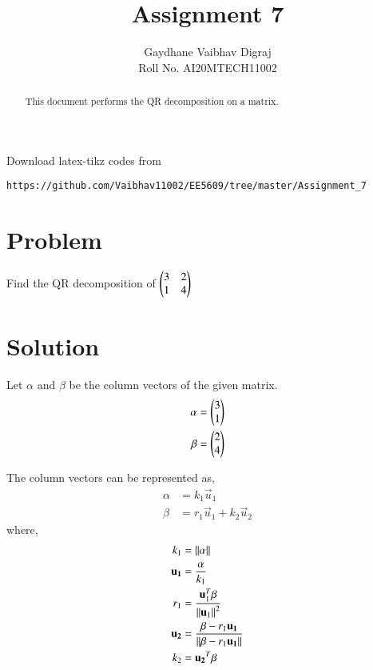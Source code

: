 \documentclass[journal,12pt,twocolumn]{IEEEtran}
\begin{document}
     \def\rightbox#1{\makebox[0in][r]{#1}}
     \def\centbox#1{\makebox[0in]{#1}}
     \def\topbox#1{\raisebox{-\baselineskip}[0in][0in]{#1}}
     \def\midbox#1{\raisebox{-0.5\baselineskip}[0in][0in]{#1}}
\vspace{3cm}
\title{Assignment 7}
\author{Gaydhane Vaibhav Digraj \\ Roll No. AI20MTECH11002}
\maketitle
\newpage
\bigskip
\renewcommand{\thefigure}{\theenumi}
\renewcommand{\thetable}{\theenumi}
\begin{abstract}
This document performs the QR decomposition on a matrix. 
\end{abstract}
%
Download latex-tikz codes from 
%
\begin{lstlisting}
https://github.com/Vaibhav11002/EE5609/tree/master/Assignment_7
\end{lstlisting}
%
\section{Problem}
Find the QR decomposition of $\begin{pmatrix}3&2\\1&4\end{pmatrix}$ 

\section{Solution}

Let $\alpha$ and $\beta$ be the column vectors of the given matrix.
\begin{align}
    \alpha &= \begin{pmatrix}3\\1\end{pmatrix} \label{eq:1}\\
    \beta &= \begin{pmatrix}2\\4\end{pmatrix} \label{eq:2} 
\end{align}

The column vectors can be represented as,
\begin{align}
\alpha&=k_1\vec{u}_1 \label{eq:3}\\
\beta&=r_1\vec{u}_1+k_2\vec{u}_2 \label{eq:4}
\end{align}
where, 
\begin{align}
k_1 &= \left\lVert\alpha\right\rVert\label{eq:5}\\
\mathbf{u_1} &= \frac{\mathbf{\alpha}}{k_1} \label{eq:6}\\
r_1 &= \frac{\mathbf{u}_1^T\beta}{\left\lVert\mathbf{u}_1\right\rVert^2} \label{eq:7}\\
\mathbf{u_2} &= \frac{\beta - r_1 \mathbf{u_1}}{\left\lVert\beta - r_1 \mathbf{u_1}\right\rVert} \label{eq:8}\\
k_2 &= {\mathbf{u_2}^T\beta}\label{eq:9}
\end{align}
\end{document}
